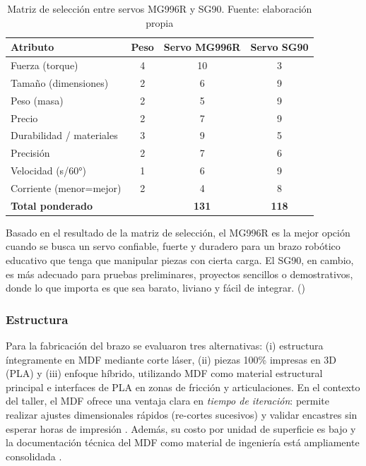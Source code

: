 \begin{table}[H]
\centering
\caption{Matriz de selección entre servos MG996R y SG90. Fuente: elaboración propia}
\begin{tabular}{lccc}
\toprule
\textbf{Atributo} & \textbf{Peso} & \textbf{Servo MG996R} & \textbf{Servo SG90} \\
\midrule
Fuerza (torque)        & 4 & 10 & 3 \\
Tamaño (dimensiones)   & 2 & 6  & 9 \\
Peso (masa)            & 2 & 5  & 9 \\
Precio                 & 2 & 7  & 9 \\
Durabilidad / materiales & 3 & 9 & 5 \\
Precisión              & 2 & 7  & 6 \\
Velocidad (s/60°)      & 1 & 6  & 9 \\
Corriente (menor=mejor) & 2 & 4  & 8 \\
\midrule
\textbf{Total ponderado} &   & \textbf{131} & \textbf{118} \\
\bottomrule
\end{tabular}
\end{table}

Basado en el resultado de la matriz de selección, el MG996R es la mejor opción cuando se busca un servo confiable, fuerte y duradero para un brazo robótico educativo que tenga que manipular piezas con cierta carga. El SG90, en cambio, es más adecuado para pruebas preliminares, proyectos sencillos o demostrativos, donde lo que importa es que sea barato, liviano y fácil de integrar. (\cite{TowerProMG996R})

\subsubsection{Estructura}

Para la fabricación del brazo se evaluaron tres alternativas: (i) estructura íntegramente en MDF mediante corte láser, (ii) piezas 100\% impresas en 3D (PLA) y (iii) enfoque híbrido, utilizando MDF como material estructural principal e interfaces de PLA en zonas de fricción y articulaciones. En el contexto del taller, el MDF ofrece una ventaja clara en \emph{tiempo de iteración}: permite realizar ajustes dimensionales rápidos (re-cortes sucesivos) y validar encastres sin esperar horas de impresión \cite{xometry_laser_vs_3dp_2022}. Además, su costo por unidad de superficie es bajo y la documentación técnica del MDF como material de ingeniería está ampliamente consolidada \cite{usda_wood_handbook_2021}.

